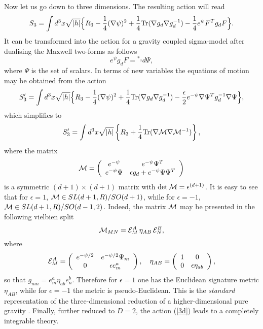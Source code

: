\documentclass[a4paper,12pt]{article}
\def\Tr{{\rm Tr}}
\begin{document}
Now let us go down to three dimensions. The resulting action will
read
\begin{equation}
S_{3} = \int d^3x \sqrt{|h|} \Bigl\{ R_{3} - \frac14(\nabla\psi)^2
+ \frac14 \Tr(\nabla g_{d} \nabla g_{d}^{-1}) - \frac14 e^\psi
F^T g_{d} F \Bigr\}.
\end{equation}
It can be transformed into the action for a gravity coupled
sigma-model after dualising the Maxwell two-forms as follows
\begin{equation}
e^{\psi} g_{d} F = {}^{*_3} d \Psi,
\end{equation}
where $\Psi$ is the set of scalars. In terms of new variables the
equations of motion may be obtained from the action
\begin{equation}
S_{3}' = \int d^3x \sqrt{|h|} \Bigl\{ R_3 - \frac14(\nabla\psi)^2
+ \frac14 \Tr(\nabla g_{d} \nabla g_{d}^{-1}) - \frac{\epsilon}2
e^{-\psi} \nabla\Psi^T g_{d}^{-1} \nabla\Psi \Bigr\},
\end{equation}
which simplifies to
\begin{equation} \label{3d}
S_{3}' = \int d^3x \sqrt{|h|} \left\{ R_{3} + \frac14
\Tr(\nabla{\cal M} \nabla{\cal M}^{-1}) \right\},
\end{equation}
where the matrix
\begin{equation} \label{M1}
{\cal M} = \left(\begin{array}{cc}
  e^{-\psi}      & e^{-\psi} \Psi^T \\
  e^{-\psi} \Psi & \epsilon g_{d} + e^{-\psi} \Psi \Psi^T
  \end{array} \right)
\end{equation}
is a symmetric $(d+1)\times(d+1)$ matrix with $\det {\cal M} =
\epsilon^{(d+1)}$. It is easy to see that for $\epsilon=1$,
${\cal M} \in SL(d+1,R)/SO(d+1)$, while for $\epsilon=-1$, ${\cal
M} \in SL(d+1,R)/SO(d-1,2)$. Indeed, the matrix ${\cal M}$ may be
presented in the following vielbien split
\begin{equation}\label{MMN}
{\cal M}_{MN} = {\cal E}^A_M \, \eta_{AB} \, {\cal E}^B_N,
\end{equation}
where
\begin{equation}\label{E1}
{\cal E}^A_M = \left( \begin{array}{cc}
  e^{-\psi/2} & e^{-\psi/2}\Psi_m \\
  0           & \epsilon e^a_m
  \end{array} \right), \quad
\eta_{AB} = \left( \begin{array}{cc}
  1 & 0 \\ 0 & \epsilon\eta_{ab}
  \end{array} \right),
\end{equation}
so that $g_{mn} = e^a_m \eta_{ab} e^b_n$. Therefore for
$\epsilon=1$ one has the Euclidean signature metric $\eta_{AB}$,
while for $\epsilon=-1$ the metric is pseudo-Euclidean. This is
the {\em standard} representation of the three-dimensional
reduction of a higher-dimensional pure gravity \cite{Ma79}.
Finally, further reduced to $D=2$, the action (\ref{3d}) leads
to a completely integrable theory.
\end{document}
